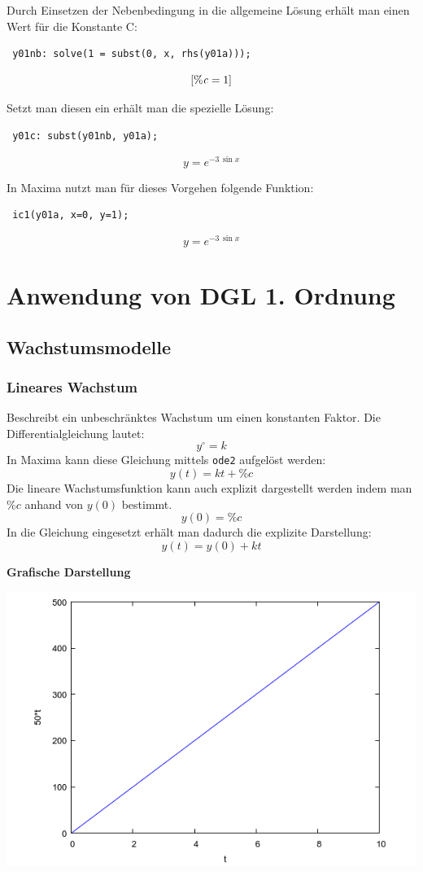 \documentclass[a4paper,12pt]{article}
\begin{document}
Durch Einsetzen der Nebenbedingung in die allgemeine Lösung erhält man einen Wert für die Konstante C:
\begin{verbatim}
 y01nb: solve(1 = subst(0, x, rhs(y01a)));
\end{verbatim}
$$\left[ {\it \%c}=1 \right] $$

Setzt man diesen ein erhält man die spezielle Lösung:
\begin{verbatim}
 y01c: subst(y01nb, y01a);
\end{verbatim}
$$y=e^ {- 3\,\sin x }$$

In Maxima nutzt man für dieses Vorgehen folgende Funktion:
\begin{verbatim}
 ic1(y01a, x=0, y=1);
\end{verbatim}
$$y=e^ {- 3\,\sin x }$$

\section{Anwendung von DGL 1. Ordnung}
\subsection{Wachstumsmodelle}
\subsubsection{Lineares Wachstum}
Beschreibt ein unbeschränktes Wachstum um einen konstanten Faktor.
Die Differentialgleichung lautet:
$$y^\circ      = k$$
In Maxima kann diese Gleichung mittels \texttt{ode2} aufgelöst werden:
$$y(t)    = kt + \%c$$
Die lineare Wachstumsfunktion kann auch explizit dargestellt werden indem man $\%c$ anhand von $y(0)$ bestimmt.
$$y(0) = \%c$$
In die Gleichung eingesetzt erh\"alt man dadurch die explizite Darstellung:
$$y(t)    = y(0) + kt$$

\begin{flushleft}
 \textbf{Grafische Darstellung}
\end{flushleft}
\includegraphics[scale=0.6]{lineares-wachstum.png}
\end{document}
